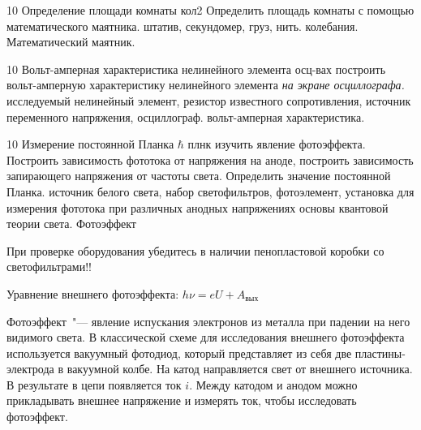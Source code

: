 \begin{enumerate}
{        }
	\item \labtitle
		{10}
		{Определение площади комнаты}
		{кол2}
		{Определить площадь комнаты с помощью математического маятника.}
		{штатив, секундомер, груз, нить.}
		{колебания. Математический маятник.}
		{\item}
	\item \labtitle
		{10}
		{Вольт-амперная характеристика нелинейного элемента}
		{осц-вах}
		{построить вольт-амперную характеристику нелинейного элемента \textit{на экране осциллографа.}}
		{исследуемый нелинейный элемент, резистор известного сопротивления, источник переменного напряжения, осциллограф.}
		{вольт-амперная характеристика. }
		{\item}
	\item \labtitle
		{10}
        {Измерение постоянной Планка $\hbar$}
        {плнк}
        {изучить явление фотоэффекта. Построить зависимость фототока от напряжения на аноде, построить зависимость запирающего напряжения от частоты света. Определить значение постоянной Планка.}
        {источник белого света, набор светофильтров, фотоэлемент, установка для измерения фототока при различных анодных напряжениях}
        {основы квантовой теории света. Фотоэффект}
        {\item При проверке оборудования убедитесь в наличии пенопластовой коробки со светофильтрами!!
            \item Уравнение внешнего фотоэффекта: $h\nu = eU + A_{вых}$
            \item Фотоэффект~"--- явление испускания электронов из металла при падении на него видимого света. В классической схеме для исследования внешнего фотоэффекта используется вакуумный фотодиод, который представляет из себя две пластины-электрода в вакуумной колбе. На катод направляется свет от внешнего источника. В результате в цепи появляется ток $i$. Между катодом и анодом можно прикладывать внешнее напряжение и измерять ток, чтобы исследовать фотоэффект.
}
\end{enumerate}
